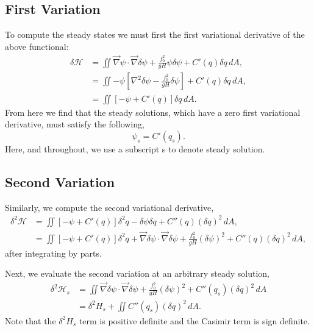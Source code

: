 \documentclass[12pt]{article}
\begin{document}
  \subsection{First Variation}
    To compute the steady states we must first the first variational derivative of the above functional:
    \begin{align*}
    \delta \mathcal{H} 
    & = \iint \vec\nabla\psi \cdot \vec\nabla \delta \psi + \frac{f_0^2}{g H} \psi \delta \psi + C'(q) \delta q \, dA, \\
    & = \iint -\psi \left[ \nabla^2 \delta \psi - \frac{f_0^2}{g H} \delta \psi \right]  + C'(q) \delta q \, dA, \\
    & = \iint \left[ - \psi + C'(q) \right]  \delta q  \, dA.
    \end{align*}
    From here we find that the steady solutions, which have a zero first variational derivative, must satisfy the following,
    $$
    \psi_s = C'(q_s).
    $$
    Here, and throughout, we use a subscript s to denote steady solution.
  
  \subsection{Second Variation}
    Similarly, we compute the second variational derivative,
    \begin{align*}
    \delta^2 \mathcal{H} 
    & = \iint \left[ - \psi + C'(q) \right]  \delta^2 q  - \delta \psi \delta q +  C''(q) (\delta q)^2  \, dA, \\
    & = \iint \left[ - \psi + C'(q) \right]  \delta^2 q   
    + \vec\nabla \delta \psi \cdot \vec \nabla \delta \psi 
    +\frac{f_0^2}{gH} (\delta \psi)^2+  C''(q) (\delta q)^2  \, dA, 
    \end{align*}
    after integrating by parts.
    
    Next, we evaluate the second variation at an arbitrary steady solution,
    \begin{align*}
    \delta^2 \mathcal{H}_s 
    & = \iint \vec\nabla \delta \psi \cdot \vec \nabla \delta \psi + \frac{f_0^2}{gH} (\delta \psi)^2+  C''(q_s) (\delta q)^2  \, dA \\
    & = \delta^2 H_s + \iint C''(q_s) (\delta q)^2  \, dA.
    \end{align*}
    Note that the $\delta^2 H_s$ term is positive definite and the Casimir term is sign definite.
  
\end{document}
